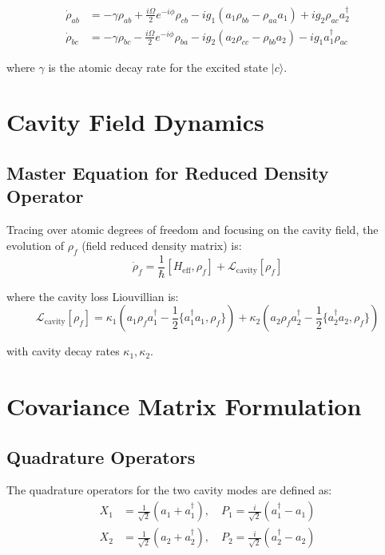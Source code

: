 \begin{align}
\dot{\rho}_{ab} &= -\gamma\rho_{ab} + \frac{i\Omega}{2}e^{-i\phi}\rho_{cb} - ig_1(a_1\rho_{bb} - \rho_{aa}a_1) + ig_2\rho_{ac}a_2^\dagger \\
\dot{\rho}_{bc} &= -\gamma\rho_{bc} - \frac{i\Omega}{2}e^{-i\phi}\rho_{ba} - ig_2(a_2\rho_{cc} - \rho_{bb}a_2) - ig_1a_1^\dagger\rho_{ac}
\end{align}

where $\gamma$ is the atomic decay rate for the excited state $|c\rangle$.

\section{Cavity Field Dynamics}

\subsection{Master Equation for Reduced Density Operator}

Tracing over atomic degrees of freedom and focusing on the cavity field, the evolution of $\rho_f$ (field reduced density matrix) is:
\begin{equation}
\dot{\rho}_f = \frac{1}{\hbar}[H_{\text{eff}}, \rho_f] + \mathcal{L}_{\text{cavity}}[\rho_f]
\end{equation}

where the cavity loss Liouvillian is:
\begin{equation}
\mathcal{L}_{\text{cavity}}[\rho_f] = \kappa_1(a_1\rho_f a_1^\dagger - \frac{1}{2}\{a_1^\dagger a_1, \rho_f\}) + \kappa_2(a_2\rho_f a_2^\dagger - \frac{1}{2}\{a_2^\dagger a_2, \rho_f\})
\end{equation}

with cavity decay rates $\kappa_1, \kappa_2$.

\section{Covariance Matrix Formulation}

\subsection{Quadrature Operators}

The quadrature operators for the two cavity modes are defined as:
\begin{align}
X_1 &= \frac{1}{\sqrt{2}}(a_1 + a_1^\dagger), \quad P_1 = \frac{i}{\sqrt{2}}(a_1^\dagger - a_1) \\
X_2 &= \frac{1}{\sqrt{2}}(a_2 + a_2^\dagger), \quad P_2 = \frac{i}{\sqrt{2}}(a_2^\dagger - a_2)
\end{align}

